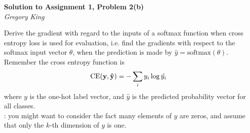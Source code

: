 \documentclass[letter,12pt]{article}
\newcommand{\myhwtitle}[3]
{\begin{center}
{\large {\bf Solution to Assignment {#1}, Problem {#2}}}\\
\medskip 
{\it {#3}} %
\end{center}}
\begin{document}
\clearpage

\myhwtitle{1}{2(b)}{Gregory King}
\bigskip

\noindent Derive the gradient with regard to the inputs of a softmax function when cross entropy loss is used for
evaluation, i.e. find the gradients with respect to the softmax input vector $\theta$, when the prediction is
made by $\hat{y} = \textrm{softmax}(\theta)$. Remember the cross entropy function is
\begin{equation}
\textrm{CE}({\bf y},{\bf\hat{y}}) = -\sum_{i}{y_{i}\log{\hat{y_{i}}}}
\end{equation}
where $y$ is the one-hot label vector, and $\hat{y}$ is the predicted probability vector for all classes. \vspace{2mm}\\
: you might want to consider the fact many elements of $y$ are zeros, and assume that only the $k$-th dimension
of $y$ is one.\vspace{5mm}
\end{document}
